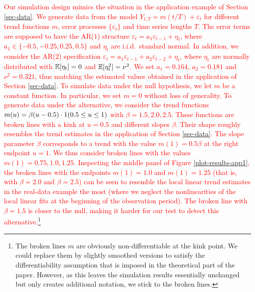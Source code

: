 \textcolor{red}{
Our simulation design mimics the situation in the application example of Section \ref{sec-data}. We generate data from the model $Y_{t,T} = m(t/T) + \varepsilon_t$ for different trend functions $m$, error processes $\{\varepsilon_t\}$ and time series lengths $T$. The error terms are supposed to have the AR($1$) structure $\varepsilon_t = a_1 \varepsilon_{t-1} + \eta_t$, where $a_1 \in \{-0.5,-0.25,0.25,0.5\}$ and $\eta_t$ are i.i.d.\ standard normal. In addition, we consider the AR($2$) specification $\varepsilon_t = a_1 \varepsilon_{t-1} + a_2 \varepsilon_{t-2} + \eta_t$, where $\eta_t$ are normally distributed with $\mathbb{E}[\eta_t] = 0$ and $\mathbb{E}[\eta_t^2] = \nu^2$. We set $a_1 = 0.164$, $a_2 = 0.181$ and $\nu^2 = 0.321$, thus matching the estimated values obtained in the application of Section \ref{sec-data}. To simulate data under the null hypothesis, we let $m$ be a constant function. In particular, we set $m = 0$ without loss of generality. To generate data under the alternative, we consider the trend functions $m(u) = \beta (u - 0.5) \cdot 1(0.5 \le u \le 1)$ with $\beta = 1.5,2.0,2.5$. These functions are broken lines with a kink at $u = 0.5$ and different slopes $\beta$. Their shape roughly resembles the trend estimates in the application of Section \ref{sec-data}. The slope parameter $\beta$ corresponds to a trend with the value $m(1) = 0.5 \beta$ at the right endpoint $u = 1$. We thus consider broken lines with the values $m(1) = 0.75, 1.0, 1.25$. Inspecting the middle panel of Figure \ref{plot-results-app1}, the broken lines with the endpoints $m(1) = 1.0$ and $m(1) = 1.25$ (that is, with $\beta = 2.0$ and $\beta = 2.5$) can be seen to resemble the local linear trend estimates in the real-data example the most (where we neglect the nonlinearities of the local linear fits at the beginning of the observation period). The broken line with $\beta = 1.5$ is closer to the null, making it harder for our test to detect this alternative.}\footnote{The broken lines $m$ are obviously non-differentiable at the kink point. We could replace them by slightly smoothed versions to satisfy the differentiability assumption that is imposed in the theoretical part of the paper. However, as this leaves the simulation results essentially unchanged but only creates additional notation, we stick to the broken lines.}


